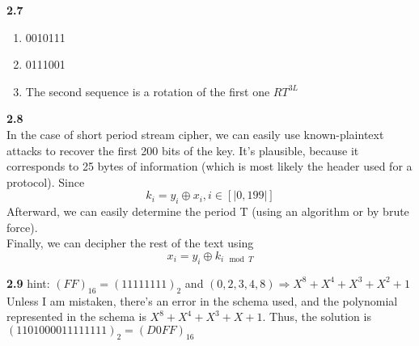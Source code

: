 \textbf{2.7}
\begin{enumerate}
    \item 0010111
    \item 0111001
    \item The second sequence is a rotation of the first one $RT^{3L}$
\end{enumerate}

\textbf{2.8}\\
In the case of short period stream cipher, we can easily use known-plaintext attacks to recover the first 200 bits of the key. It's plausible, because it corresponds to 25 bytes of information (which is most likely the header used for a protocol). Since \begin{equation*}
    k_i = y_i \oplus x_i , i\in [|0,199|]
\end{equation*}
Afterward, we can easily determine the period T (using an algorithm or by brute force).\\
Finally, we can decipher the rest of the text using
\begin{equation*}
    x_i = y_i \oplus k_{i \mod{T}}
\end{equation*}

\textbf{2.9}
hint: $(FF)_{16} = (11111111)_2$
and $(0,2,3,4,8) \Rightarrow X^8 + X^4 + X^3 + X^2 + 1$ \\
Unless I am mistaken, there's an error in the schema used, and the polynomial represented in the schema is $X^8 + X^4 + X^3+X+1$. Thus, the solution is $(1101000011111111)_2 = (D0FF)_{16}$

